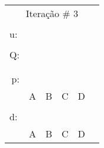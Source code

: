 \documentclass[16pt]{examdesign}
\begin{document}
\begin{fillin}[title={},
                    rearrange=no,resetcounter=no,suppressprefix]
\begin{question}
\begin{multicols}{4}
\begin{tabular}{|llllll|}
  \end{tabular}
  \begin{tabular}{|llllll|}
  \hline
  \multicolumn{6}{|c|}{Iteração \# 3}                                                                                                          \\
					    &                       &                       &                       &                       &  \\
  u:                                        &                       &                       &                       &                       &  \\ \cline{2-3}
					    &                       &                       &                       &                       &  \\ \cline{2-5}
  \multicolumn{1}{|r|}{Q:}                  & \multicolumn{1}{l|}{} & \multicolumn{1}{l|}{} & \multicolumn{1}{l|}{} & \multicolumn{1}{l|}{} &  \\
  \multicolumn{1}{|l|}{}                    & \multicolumn{1}{l|}{} & \multicolumn{1}{l|}{} & \multicolumn{1}{l|}{} & \multicolumn{1}{l|}{} &  \\ \cline{2-5}
					    &                       &                       &                       &                       &  \\ \cline{2-5}
  \multicolumn{1}{|r|}{\multirow{2}{*}{p:}} & \multicolumn{1}{l|}{} & \multicolumn{1}{l|}{} & \multicolumn{1}{l|}{} & \multicolumn{1}{l|}{} &  \\
  \multicolumn{1}{|r|}{}                    & \multicolumn{1}{l|}{} & \multicolumn{1}{l|}{} & \multicolumn{1}{l|}{} & \multicolumn{1}{l|}{} &  \\ \cline{2-5}
					    & A                     & B                     & C                     & D                     &  \\
					    &                       &                       &                       &                       &  \\ \cline{2-5}
  \multicolumn{1}{|l|}{\multirow{2}{*}{d:}} & \multicolumn{1}{l|}{} & \multicolumn{1}{l|}{} & \multicolumn{1}{l|}{} & \multicolumn{1}{l|}{} &  \\
  \multicolumn{1}{|l|}{}                    & \multicolumn{1}{l|}{} & \multicolumn{1}{l|}{} & \multicolumn{1}{l|}{} & \multicolumn{1}{l|}{} &  \\ \cline{2-5}
					    & A                     & B                     & C                     & D                     &  \\ \hline

\end{tabular}
\end{multicols}
\end{question}
\end{fillin}
\end{document}
